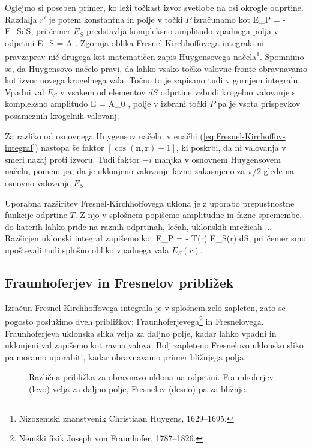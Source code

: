 Oglejmo si poseben primer, ko leži točkast izvor svetlobe na osi okrogle odprtine. Razdalja
$r'$ je potem konstantna in polje v točki $P$ izračunamo kot 
\beq
\label{eq:Fresnelov-uklon}
E_P =  - \int E_S dS,
\eeq
pri čemer $E_S$ predstavlja kompleksno amplitudo vpadnega polja v odprtini
\beq
E_S = A .
\eeq 
Zgornja oblika Fresnel-Kirchhoffovega integrala ni pravzaprav nič drugega kot 
matematičen zapis Huygensovega 
načela\footnote{Nizozemski znanstvenik Christiaan Huygens, 1629--1695.}. 
Spomnimo se, da Huygensovo načelo pravi, da lahko vsako točko valovne fronte obravnavamo 
kot izvor novega krogelnega vala. Točno to je zapisano tudi v gornjem integralu. Vpadni val
$E_S$ v vsakem od elementov $dS$ odprtine vzbudi krogelno valovanje s
kompleksno amplitudo
\beq
E = A_0 ,
\eeq 
polje v izbrani točki $P$ pa je vsota prispevkov posameznih krogelnih valovanj.

Za razliko od osnovnega Huygensov načela, v enačbi (\ref{eq:Fresnel-Kirchoffov-integral})
nastopa še faktor $\left[\cos(\mathbf{n},\mathbf{r})-1\right]$, ki poskrbi, da ni valovanja 
v smeri nazaj proti izvoru. Tudi faktor $-i$ manjka v osnovnem Huygensovem načelu,
pomeni pa, da je uklonjeno valovanje fazno zakasnjeno za $\pi/2$ glede na osnovno
valovanje $E_S$.

Uporabna razširitev Fresnel-Kirchhoffovega uklona je z uporabo prepustnostne funkcije odprtine $T$.
Z njo v splošnem popišemo amplitudne in fazne spremembe, do katerih lahko pride na raznih 
odprtinah, lečah, uklonskih mrežicah ... Razširjen uklonski integral zapišemo kot
\beq
\label{eq:Fresnelov-uklon2}
E_P =  - \int T(r) E_S(r) 
 dS,
\eeq
pri čemer smo upoštevali tudi splošno obliko vpadnega vala $E_S(r)$.

\subsection*{Fraunhoferjev in Fresnelov približek}
\label{FFuklon}
Izračun Fresnel-Kirchhoffovega integrala je v splošnem zelo zapleten, zato se 
pogosto poslužimo dveh približkov: Fraunhoferjevega\footnote{Nemški fizik 
Joseph von Fraunhofer, 1787--1826.} in Fresnelovega. 
Fraunhoferjeva uklonska slika velja za daljno polje, kadar lahko 
vpadni in uklonjeni val zapišemo kot ravna valova. Bolj zapleteno Fresnelovo uklonsko sliko pa moramo
uporabiti, kadar obravnavamo primer bližnjega polja. 
\begin{figure}[h]
\centering {} 
  
\caption{Različna približka za obravnavo uklona na odprtini. Fraunhoferjev (levo) velja za daljno polje,
Fresnelov (desno) pa za bližnje.}
\label{fig:UklonFF}
\end{figure}

